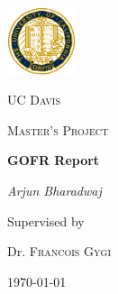 \begin{titlepage}
	\centering
	\includegraphics[width=0.15\textwidth]{ucdavis_logo}\par\vspace{1cm}
	{\scshape\LARGE UC Davis \par}
	\vspace{1cm}
	{\scshape\Large Master's Project\par}
	\vspace{1.5cm}
	{\huge\bfseries GOFR Report\par}
	\vspace{2cm}
	{\Large\itshape Arjun Bharadwaj\par}
	\vfill
	Supervised by\par
	Dr. \textsc{Francois Gygi}

	\vfill

	{\large \today\par}
\end{titlepage}